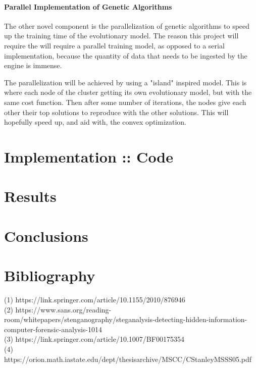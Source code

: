 \documentclass[12pt]{article}
\begin{document}
\paragraph{Parallel Implementation of Genetic Algorithms}
\par The other novel component is the parallelization of genetic
algorithms to speed up the training time of the evolutionary model. The reason this project will require the will require a parallel training model, as opposed to a serial implementation, because the quantity of data that needs to be ingested by the engine is immense.
\par The parallelization will be achieved by using a "island" inspired model. This is where each node of the cluster getting its own evolutionary model, but with the same cost function. Then after some number of iterations, the nodes give each other their top solutions to reproduce with the other solutions. This will hopefully speed up, and aid with, the convex optimization.


\section{Implementation :: Code}

\section{Results}


\section{Conclusions}

\section{Bibliography}
(1) https://link.springer.com/article/10.1155/2010/876946 \\
(2) https://www.sans.org/reading-room/whitepapers/stenganography/steganalysis-detecting-hidden-information-computer-forensic-analysis-1014 \\
(3) https://link.springer.com/article/10.1007/BF00175354 \\
(4) https://orion.math.iastate.edu/dept/thesisarchive/MSCC/CStanleyMSSS05.pdf
\end{document}
